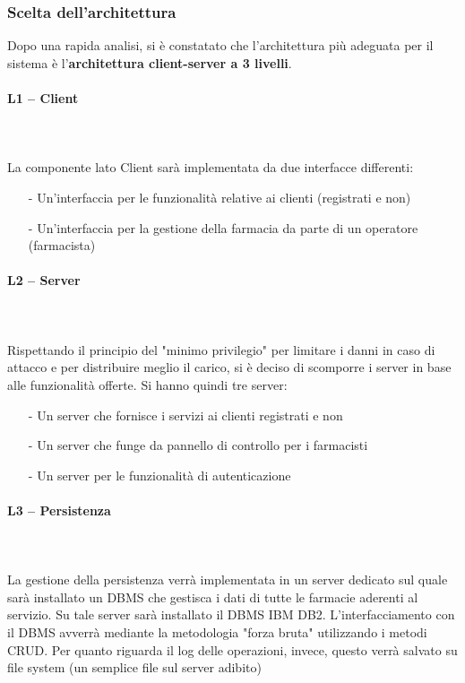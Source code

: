 \subsubsection{Scelta dell'architettura}

Dopo una rapida analisi, si è constatato che l'architettura più adeguata per il sistema è l'\textbf{architettura client-server a 3 livelli}.

\paragraph{L1 -- Client}\mbox{}\\ \\
La componente lato Client sarà implementata da due interfacce differenti:

\begin{itemize}
\item[-] Un'interfaccia per le funzionalità relative ai clienti (registrati e non)
\item[-] Un'interfaccia per la gestione della farmacia da parte di un operatore (farmacista)
\end{itemize}

\paragraph{L2 -- Server}\mbox{}\\ \\
Rispettando il principio del "minimo privilegio" per limitare i danni in caso di attacco e per distribuire meglio il carico, si è deciso di scomporre i server in base alle funzionalità offerte. Si hanno quindi tre server:

\begin{itemize}
\item[-] Un server che fornisce i servizi ai clienti registrati e non
\item[-] Un server che funge da pannello di controllo per i farmacisti
\item[-] Un server per le funzionalità di autenticazione
\end{itemize}

\paragraph{L3 -- Persistenza}\mbox{}\\ \\
La gestione della persistenza verrà implementata in un server dedicato sul quale sarà installato un DBMS che gestisca i dati di tutte le farmacie aderenti al servizio.
Su tale server sarà installato il DBMS IBM DB2.
L'interfacciamento con il DBMS avverrà mediante la metodologia "forza bruta" utilizzando i metodi CRUD.
Per quanto riguarda il log delle operazioni, invece, questo verrà salvato su file system (un semplice file sul server adibito)

